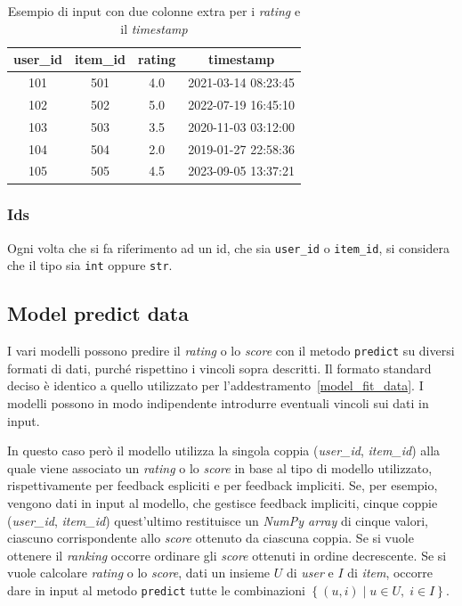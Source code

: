 \begin{table}[H]
    \centering
    \begin{tabular}{|c|c|c|c|}
    \hline
    \textbf{user\_id} & \textbf{item\_id} & \textbf{rating} & \textbf{timestamp} \\
    \hline
        101 & 501 & 4.0 & 2021-03-14 08:23:45 \\
        102 & 502 & 5.0 & 2022-07-19 16:45:10 \\
        103 & 503 & 3.5 & 2020-11-03 03:12:00 \\
        104 & 504 & 2.0 & 2019-01-27 22:58:36 \\
        105 & 505 & 4.5 & 2023-09-05 13:37:21 \\
    \hline
    \end{tabular}
    \caption{Esempio di input con due colonne extra per i \textit{rating} e il \textit{timestamp}}
    \label{tab:ratings}
\end{table}

\subsubsection{Ids}

Ogni volta che si fa riferimento ad un id, che sia \texttt{user\_id} o \texttt{item\_id}, si considera che il tipo sia \texttt{int} oppure \texttt{str}. 

\subsection{Model predict data}\label{model_predict_data}

I vari modelli possono predire il \textit{rating} o lo \textit{score} con il metodo \texttt{predict} su diversi formati di dati, purché rispettino i vincoli sopra descritti. Il formato standard deciso è identico a quello utilizzato per l'addestramento~\ref{model_fit_data}. I modelli possono in modo indipendente introdurre eventuali vincoli sui dati in input.

In questo caso però il modello utilizza la singola coppia (\textit{user\_id}, \textit{item\_id}) alla quale viene associato un \textit{rating} o lo \textit{score} in base al tipo di modello utilizzato, rispettivamente per feedback espliciti e per feedback impliciti. Se, per esempio, vengono dati in input al modello, che gestisce feedback impliciti, cinque coppie (\textit{user\_id}, \textit{item\_id}) quest'ultimo restituisce un \textit{NumPy array} di cinque valori, ciascuno corrispondente allo \textit{score} ottenuto da ciascuna coppia. Se si vuole ottenere il \textit{ranking} occorre ordinare gli \textit{score} ottenuti in ordine decrescente. Se si vuole calcolare \textit{rating} o lo \textit{score}, dati un insieme $U$ di \textit{user} e $I$ di \textit{item}, occorre dare in input al metodo \texttt{predict} tutte le combinazioni $\left\{(u, i) \mid u \in U,\; i \in I \right\}$.

